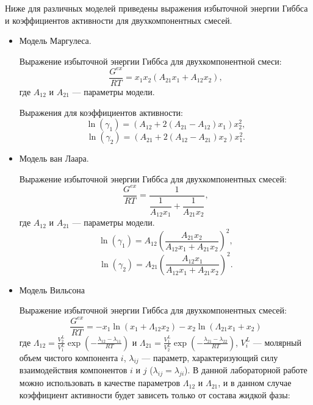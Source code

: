 Ниже для различных моделей приведены выражения избыточной энергии Гиббса и коэффициентов активности для двухкомпонентных смесей.
\begin{itemize}
	\item Модель Маргулеса.
	
	Выражение избыточной энергии Гиббса для двухкомпонентной смеси:
	\begin{equation}\label{eq.phase.gemarg}
	\frac{G^{ex}}{RT}=x_1 x_2 (A_{21} x_1+ A_{12} x_2),
	\end{equation}
	где $A_{12}$ и $A_{21}$ --- параметры модели.
	
	Выражения для коэффициентов активности:
	\begin{equation} \label{eq.phase.ga1marg}
	\ln(\gamma_1)=(A_{12}+2(A_{21}-A_{12})x_1)x_2^2,
	\end{equation}
	\begin{equation} \label{eq.phase.ga2marg}
	\ln(\gamma_2)=(A_{21}+2(A_{12}-A_{21})x_2)x_1^2.
	\end{equation}
	
	\item Модель ван Лаара.
	
	Выражение избыточной энергии Гиббса для двухкомпонентных смесей:
	\begin{equation}\label{eq.phase.gewlar}
	\frac{G^{ex}}{RT}=\dfrac{1}{\dfrac{1}{A_{12} x_1}+ \dfrac{1}{A_{21}x_2}},
	\end{equation}
	где $A_{12}$ и $A_{21}$ --- параметры модели.
	\begin{equation}
	\ln(\gamma_1)=A_{12}\left( \dfrac{A_{21}x_2}{A_{12}x_1 + A_{21} x_2}\right)^2,
	\end{equation}
	\begin{equation}
	\ln(\gamma_2)=A_{21}\left( \dfrac{A_{12}x_1}{A_{12}x_1 + A_{21} x_2}\right)^2.
	\end{equation}
	
	\item Модель Вильсона
	
	Выражение избыточной энергии Гиббса для двухкомпонентных смесей:
	\begin{equation}\label{eq.phase.wilson}
	\frac{G^{ex}}{RT}=-x_1 \ln(x_1+\Lambda_{12} x_2)-x_2 \ln(\Lambda_{21} x_1 +x_2)
	\end{equation}
	где $\Lambda_{12}=\frac{V_2^L}{V_1^L}\exp\left(-\frac{\lambda_{12}-\lambda_{11}}{RT} \right)$ и $\Lambda_{21}=\frac{V_1^L}{V_2^L}\exp\left(-\frac{\lambda_{21}-\lambda_{22}}{RT}\right)$,  $V_i^L$ --- молярный объем чистого компонента $i$, $\lambda_{ij}$ --- параметр, характеризующий силу взаимодействия компонентов $i$ и $j$ ($\lambda_{ij}=\lambda_{ji}$). 	В данной лабораторной работе можно использовать в качестве параметров $\Lambda_{12}$ и $\Lambda_{21}$, и в данном случае коэффициент активности будет зависеть только от состава жидкой фазы:
	

\end{itemize}
